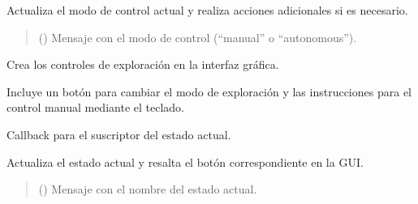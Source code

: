 \documentclass[a4paper,10pt,spanish]{sphinxmanual}
\begin{document}
\begin{fulllineitems}
\begin{fulllineitems}
\sphinxAtStartPar
Actualiza el modo de control actual y realiza acciones adicionales si es necesario.
\begin{quote}\begin{description}
\sphinxAtStartPar
{} () \textendash{} Mensaje con el modo de control (“manual” o “autonomous”).

\end{description}\end{quote}

\end{fulllineitems}


\begin{fulllineitems}
\label{\detokenize{squad_state_manager:squad_state_manager.InterfazManager.create_exploration_controls}}
\pysigstartsignatures
{}
\pysigstopsignatures
\sphinxAtStartPar
Crea los controles de exploración en la interfaz gráfica.

\sphinxAtStartPar
Incluye un botón para cambiar el modo de exploración y las instrucciones para el
control manual mediante el teclado.

\end{fulllineitems}


\begin{fulllineitems}
\label{\detokenize{squad_state_manager:squad_state_manager.InterfazManager.current_state_callback}}
\pysigstartsignatures
{}
\pysigstopsignatures
\sphinxAtStartPar
Callback para el suscriptor del estado actual.

\sphinxAtStartPar
Actualiza el estado actual y resalta el botón correspondiente en la GUI.
\begin{quote}\begin{description}
\sphinxAtStartPar
{} () \textendash{} Mensaje con el nombre del estado actual.


\end{description}
\end{quote}
\end{fulllineitems}
\end{fulllineitems}
\end{document}
